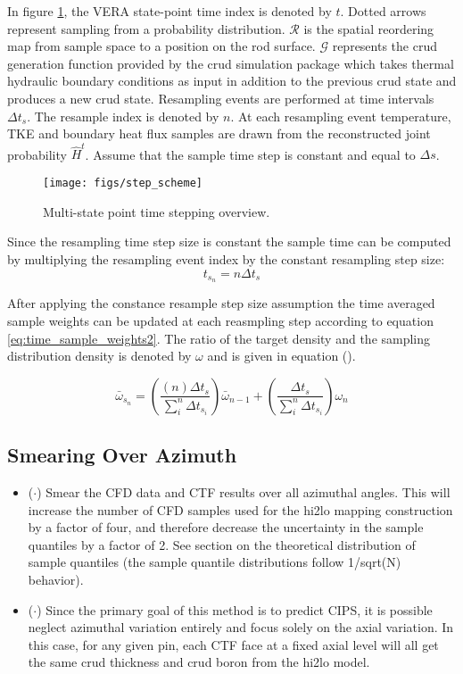 In figure \ref{fig:stepscheme}, the VERA state-point time index is denoted by $t$. Dotted arrows represent sampling from a probability distribution.  $\mathcal R$ is the spatial reordering map from sample space to a position on the rod surface. $\mathcal G$ represents the crud generation function provided by the crud simulation package which takes thermal hydraulic boundary conditions as input in addition to the previous crud state and produces a new crud state.  Resampling events are performed at time intervals $\Delta t_s$.  The resample index is denoted by $n$.  At each resampling event temperature, TKE and boundary heat flux samples are drawn from the reconstructed joint probability $\hat H^t$.  Assume that the sample time step is constant and equal to $\Delta s$.

\begin{figure}[H]
    \centering
    \texttt{[image: figs/step\_scheme]}
    \caption{Multi-state point time stepping overview.}
    \label{fig:stepscheme}
\end{figure}

Since the resampling time step size is constant the sample time can be computed by multiplying the resampling event index by the constant resampling step size:
\begin{equation}
t_{s_n} = n\Delta t_s
\end{equation}

After applying the constance resample step size assumption the time averaged sample weights can be updated at each reasmpling step according to equation \ref{eq:time_sample_weights2}.
The ratio of the target density and the sampling distribution density is denoted by $\omega$ and is given in equation ().  

\begin{equation}
\bar \omega_{s_n} = \left( \frac{(n) \Delta t_s}{\sum_i^n \Delta t_{s_i}} \right) \bar \omega_{n-1} + \left( \frac{\Delta t_s}{\sum_i^n \Delta t_{s_i}} \right) \omega_n
\label{eq:time_sample_weights2}
\end{equation}

\subsection{Smearing Over Azimuth}

\begin{itemize}
        \item ($\cdot$) Smear the CFD data and CTF results over all azimuthal angles.  This will increase the number of CFD samples used for the hi2lo mapping construction by a factor of four, and therefore decrease the uncertainty in the sample quantiles by a factor of 2.  See section on the theoretical distribution of sample quantiles (the sample quantile distributions follow 1/sqrt(N) behavior).
        \item ($\cdot$) Since the primary goal of this method is to predict CIPS, it is possible neglect azimuthal variation entirely and focus solely on the axial variation.  In this case, for any given pin, each CTF face at a fixed axial level will all get the same crud thickness and crud boron from the hi2lo model.
\end{itemize}
